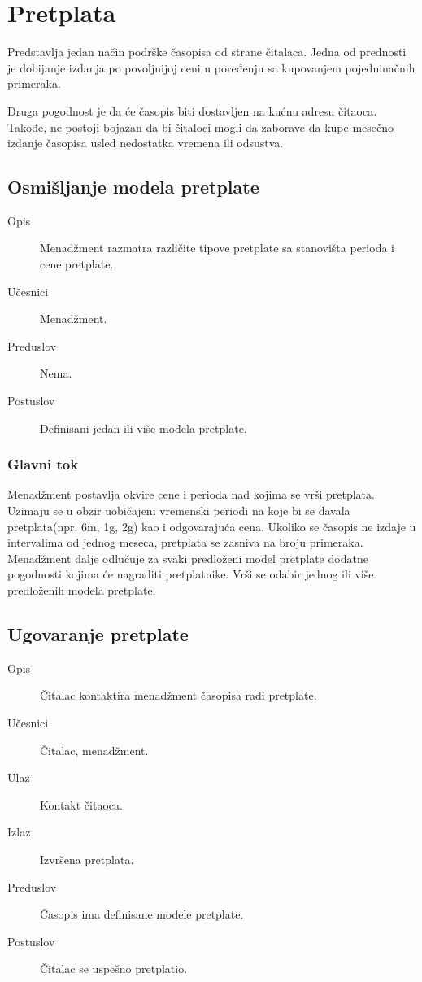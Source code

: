 \section{Pretplata}
Predstavlja jedan način podrške časopisa od strane čitalaca. Jedna od prednosti je dobijanje izdanja po povoljnijoj ceni u poređenju sa kupovanjem pojedninačnih primeraka. 

Druga pogodnost je da će časopis biti dostavljen na kućnu adresu čitaoca. Takođe, ne postoji bojazan da bi čitaloci mogli da zaborave da kupe mesečno izdanje časopisa usled nedostatka vremena ili odsustva.

\subsection{Osmišljanje modela pretplate}
\begin{description}
\item [Opis] Menadžment razmatra različite tipove pretplate sa stanovišta perioda i cene pretplate.
\item [Učesnici] Menadžment.
\item [Preduslov] Nema.
\item [Postuslov] Definisani jedan ili više modela pretplate.
\end{description}
\subsubsection{Glavni tok}
Menadžment postavlja okvire cene i perioda nad kojima se vrši pretplata. Uzimaju se u obzir uobičajeni vremenski periodi na koje bi se davala pretplata(npr. 6m, 1g, 2g) kao i odgovarajuća cena.
Ukoliko se časopis ne izdaje u intervalima od jednog meseca, pretplata se zasniva na broju primeraka. Menadžment dalje odlučuje za svaki predloženi model pretplate dodatne pogodnosti kojima će nagraditi pretplatnike.
Vrši se odabir jednog ili više predloženih modela pretplate.

\subsection{Ugovaranje pretplate}
\begin{description}
\item [Opis] Čitalac kontaktira menadžment časopisa radi pretplate.
\item [Učesnici] Čitalac, menadžment.
\item [Ulaz] Kontakt čitaoca.
\item [Izlaz] Izvršena pretplata.
\item [Preduslov] Časopis ima definisane modele pretplate.
\item [Postuslov] Čitalac se uspešno pretplatio.
\end{description}
